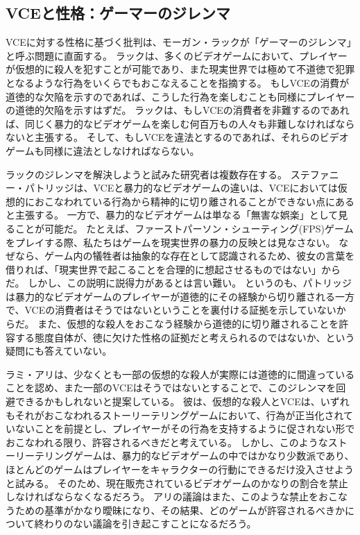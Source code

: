 \documentclass[paper=a4,book,openany]{jlreq}
\begin{document}
\subsection{VCEと性格：ゲーマーのジレンマ}

VCEに対する性格に基づく批判は、モーガン・ラックが「ゲーマーのジレンマ」と呼ぶ問題に直面する。
ラックは、多くのビデオゲームにおいて、プレイヤーが仮想的に殺人を犯すことが可能であり、また現実世界では極めて不道徳で犯罪となるような行為をいくらでもおこなえることを指摘する。
もしVCEの消費が道徳的な欠陥を示すのであれば、こうした行為を楽しむことも同様にプレイヤーの道徳的欠陥を示すはずだ。
ラックは、もしVCEの消費者を非難するのであれば、同じく暴力的なビデオゲームを楽しむ何百万もの人々も非難しなければならないと主張する。
そして、もしVCEを違法とするのであれば、それらのビデオゲームも同様に違法としなければならない\citep{luck09:_gamer_dilem}。

ラックのジレンマを解決しようと試みた研究者は複数存在する。
ステファニー・パトリッジは、VCEと暴力的なビデオゲームの違いは、VCEにおいては仮想的におこなわれている行為から精神的に切り離されることができない点にあると主張する。
一方で、暴力的なビデオゲームは単なる「無害な娯楽」として見ることが可能だ。
たとえば、ファーストパーソン・シューティング(FPS)ゲームをプレイする際、私たちはゲームを現実世界の暴力の反映とは見なさない。
なぜなら、ゲーム内の犠牲者は抽象的な存在として認識されるため、彼女の言葉を借りれば、「現実世界で起こることを合理的に想起させるものではない」からだ\citep[p.33]{patridge13:_pornog_ethic_video_games}。
しかし、この説明に説得力があるとは言い難い。
というのも、パトリッジは暴力的なビデオゲームのプレイヤーが道徳的にその経験から切り離される一方で、VCEの消費者はそうではないということを裏付ける証拠を示していないからだ。
また、仮想的な殺人をおこなう経験から道徳的に切り離されることを許容する態度自体が、徳に欠けた性格の証拠だと考えられるのではないか、という疑問にも答えていない。

ラミ・アリは、少なくとも一部の仮想的な殺人が実際には道徳的に間違っていることを認め、また一部のVCEはそうではないとすることで、このジレンマを回避できるかもしれないと提案している。
彼は、仮想的な殺人とVCEは、いずれもそれがおこなわれるストーリーテリングゲームにおいて、行為が正当化されていないことを前提とし、プレイヤーがその行為を支持するように促されない形でおこなわれる限り、許容されるべきだと考えている\citep{ali15:_new_solut_gamer_dilem}。
しかし、このようなストーリーテリングゲームは、暴力的なビデオゲームの中ではかなり少数派であり、ほとんどのゲームはプレイヤーをキャラクターの行動にできるだけ没入させようと試みる。
そのため、現在販売されているビデオゲームのかなりの割合を禁止しなければならなくなるだろう。
アリの議論はまた、このような禁止をおこなうための基準がかなり曖昧になり、その結果、どのゲームが許容されるべきかについて終わりのない議論を引き起こすことになるだろう。
\end{document}
